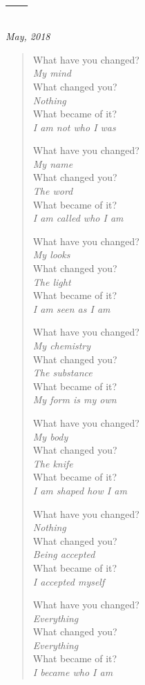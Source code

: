 \newpage
\section{---}

\hfill\textit{May, 2018}

\begin{verse}
What have you changed?\\
\vin \emph{My mind}\\
What changed you?\\
\vin \emph{Nothing}\\
What became of it?\\
\vin \emph{I am not who I was}

What have you changed?\\
\vin \emph{My name}\\
What changed you?\\
\vin \emph{The word}\\
What became of it?\\
\vin \emph{I am called who I am}

What have you changed?\\
\vin \emph{My looks}\\
What changed you?\\
\vin \emph{The light}\\
What became of it?\\
\vin \emph{I am seen as I am}

What have you changed?\\
\vin \emph{My chemistry}\\
What changed you?\\
\vin \emph{The substance}\\
What became of it?\\
\vin \emph{My form is my own}
\newpage

What have you changed?\\
\vin \emph{My body}\\
What changed you?\\
\vin \emph{The knife}\\
What became of it?\\
\vin \emph{I am shaped how I am}

What have you changed?\\
\vin \emph{Nothing}\\
What changed you?\\
\vin \emph{Being accepted}\\
What became of it?\\
\vin \emph{I accepted myself}

What have you changed?\\
\vin \emph{Everything}\\
What changed you?\\
\vin \emph{Everything}\\
What became of it?\\
\vin \emph{I became who I am}
\end{verse}
